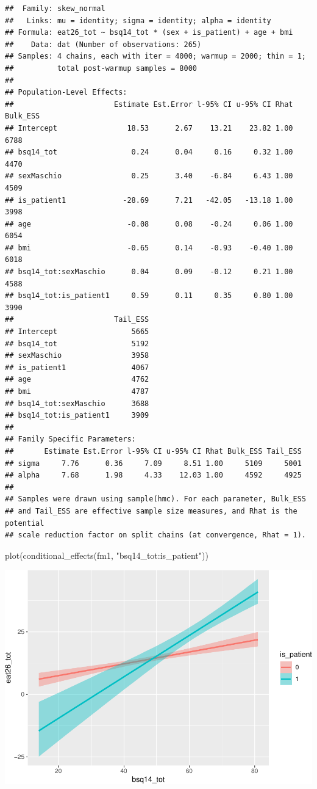 \documentclass[
]{article}
\newenvironment{Shaded}{\begin{snugshade}}{\end{snugshade}}
\newcommand{\FunctionTok}[1]{\textcolor[rgb]{0.00,0.00,0.00}{#1}}
\newcommand{\NormalTok}[1]{#1}
\newcommand{\StringTok}[1]{\textcolor[rgb]{0.31,0.60,0.02}{#1}}
\begin{document}
\begin{verbatim}
##  Family: skew_normal 
##   Links: mu = identity; sigma = identity; alpha = identity 
## Formula: eat26_tot ~ bsq14_tot * (sex + is_patient) + age + bmi 
##    Data: dat (Number of observations: 265) 
## Samples: 4 chains, each with iter = 4000; warmup = 2000; thin = 1;
##          total post-warmup samples = 8000
## 
## Population-Level Effects: 
##                       Estimate Est.Error l-95% CI u-95% CI Rhat Bulk_ESS
## Intercept                18.53      2.67    13.21    23.82 1.00     6788
## bsq14_tot                 0.24      0.04     0.16     0.32 1.00     4470
## sexMaschio                0.25      3.40    -6.84     6.43 1.00     4509
## is_patient1             -28.69      7.21   -42.05   -13.18 1.00     3998
## age                      -0.08      0.08    -0.24     0.06 1.00     6054
## bmi                      -0.65      0.14    -0.93    -0.40 1.00     6018
## bsq14_tot:sexMaschio      0.04      0.09    -0.12     0.21 1.00     4588
## bsq14_tot:is_patient1     0.59      0.11     0.35     0.80 1.00     3990
##                       Tail_ESS
## Intercept                 5665
## bsq14_tot                 5192
## sexMaschio                3958
## is_patient1               4067
## age                       4762
## bmi                       4787
## bsq14_tot:sexMaschio      3688
## bsq14_tot:is_patient1     3909
## 
## Family Specific Parameters: 
##       Estimate Est.Error l-95% CI u-95% CI Rhat Bulk_ESS Tail_ESS
## sigma     7.76      0.36     7.09     8.51 1.00     5109     5001
## alpha     7.68      1.98     4.33    12.03 1.00     4592     4925
## 
## Samples were drawn using sample(hmc). For each parameter, Bulk_ESS
## and Tail_ESS are effective sample size measures, and Rhat is the potential
## scale reduction factor on split chains (at convergence, Rhat = 1).
\end{verbatim}

\begin{Shaded}
\begin{Highlighting}[]
\FunctionTok{plot}\NormalTok{(}\FunctionTok{conditional\_effects}\NormalTok{(fm1, }\StringTok{"bsq14\_tot:is\_patient"}\NormalTok{))}
\end{Highlighting}
\end{Shaded}

\includegraphics{050_quest_groups_files/figure-latex/unnamed-chunk-2-15.pdf}
\end{document}
